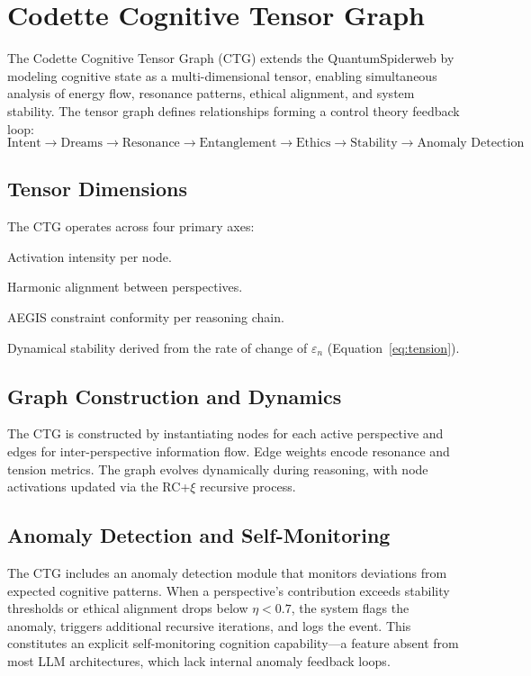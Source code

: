 \documentclass[11pt,a4paper]{article}
\newcommand{\rcxi}{RC+$\xi$}
\begin{document}
\section{Codette Cognitive Tensor Graph}
\label{sec:ctg}

The Codette Cognitive Tensor Graph (CTG) extends the QuantumSpiderweb by modeling cognitive state as a multi-dimensional tensor, enabling simultaneous analysis of energy flow, resonance patterns, ethical alignment, and system stability. The tensor graph defines relationships forming a control theory feedback loop:
\[
  \text{Intent} \to \text{Dreams} \to \text{Resonance} \to \text{Entanglement} \to \text{Ethics} \to \text{Stability} \to \text{Anomaly Detection}
\]

\subsection{Tensor Dimensions}
The CTG operates across four primary axes:
\begin{description}[leftmargin=*]
  \item[Cognitive Energy ($E$)] Activation intensity per node.
  \item[Resonance ($R$)] Harmonic alignment between perspectives.
  \item[Ethical Alignment ($\eta$)] AEGIS constraint conformity per reasoning chain.
  \item[Stability ($S$)] Dynamical stability derived from the rate of change of $\varepsilon_n$ (Equation~\ref{eq:tension}).
\end{description}

\subsection{Graph Construction and Dynamics}
The CTG is constructed by instantiating nodes for each active perspective and edges for inter-perspective information flow. Edge weights encode resonance and tension metrics. The graph evolves dynamically during reasoning, with node activations updated via the \rcxi{} recursive process.

\subsection{Anomaly Detection and Self-Monitoring}
The CTG includes an anomaly detection module that monitors deviations from expected cognitive patterns. When a perspective's contribution exceeds stability thresholds or ethical alignment drops below $\eta < 0.7$, the system flags the anomaly, triggers additional recursive iterations, and logs the event. This constitutes an explicit self-monitoring cognition capability---a feature absent from most LLM architectures, which lack internal anomaly feedback loops.
\end{document}
